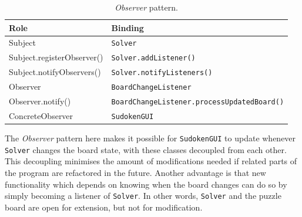 \documentclass[a4paper, 11pt]{article}
\begin{document}
        \begin{table}[h!]
        \centering
        \begin{tabular}{l l}
        \textbf{Role}              & \textbf{Binding} \\ \hline
        Subject                    & \texttt{Solver} \\
        Subject.registerObserver() & \texttt{Solver.addListener()} \\
        Subject.notifyObservers()  & \texttt{Solver.notifyListeners()} \\
        Observer                   & \texttt{BoardChangeListener} \\
        Observer.notify()          & \texttt{BoardChangeListener.processUpdatedBoard()} \\
        ConcreteObserver           & \texttt{SudokenGUI} \\
        \end{tabular}
        \caption{\textit{Observer} pattern.}
        \label{table:observer}
        \end{table}

The \textit{Observer} pattern here makes it possible for \texttt{SudokenGUI} to update whenever \texttt{Solver} changes the board state, with these classes decoupled from each other. This decoupling minimises the amount of modifications needed if related parts of the program are refactored in the future. Another advantage is that new functionality which depends on knowing when the board changes can do so by simply becoming a listener of \texttt{Solver}. In other words, \texttt{Solver} and the puzzle board are open for extension, but not for modification.
\end{document}
